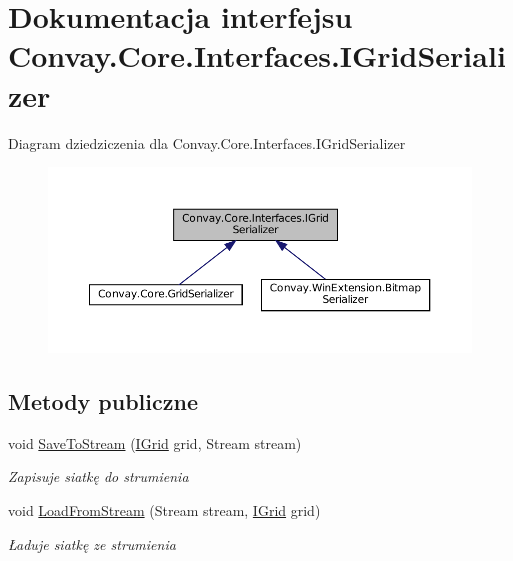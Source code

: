 \hypertarget{interface_convay_1_1_core_1_1_interfaces_1_1_i_grid_serializer}{}\section{Dokumentacja interfejsu Convay.\+Core.\+Interfaces.\+I\+Grid\+Serializer}
\label{interface_convay_1_1_core_1_1_interfaces_1_1_i_grid_serializer}


Diagram dziedziczenia dla Convay.\+Core.\+Interfaces.\+I\+Grid\+Serializer
\nopagebreak
\begin{figure}[H]
\begin{center}
\leavevmode
\includegraphics[width=350pt]{interface_convay_1_1_core_1_1_interfaces_1_1_i_grid_serializer__inherit__graph}
\end{center}
\end{figure}
\subsection*{Metody publiczne}
\begin{DoxyCompactItemize}
\item 
void \hyperlink{interface_convay_1_1_core_1_1_interfaces_1_1_i_grid_serializer_ac8de4f85acd03d95f73a7c7f85db43b2}{Save\+To\+Stream} (\hyperlink{interface_convay_1_1_core_1_1_interfaces_1_1_i_grid}{I\+Grid} grid, Stream stream)
\begin{DoxyCompactList}\small\item\em Zapisuje siatkę do strumienia \end{DoxyCompactList}\item 
void \hyperlink{interface_convay_1_1_core_1_1_interfaces_1_1_i_grid_serializer_ab6297bf5bb8f31e4ee4c27e4edfcd2bc}{Load\+From\+Stream} (Stream stream, \hyperlink{interface_convay_1_1_core_1_1_interfaces_1_1_i_grid}{I\+Grid} grid)
\begin{DoxyCompactList}\small\item\em Ładuje siatkę ze strumienia \end{DoxyCompactList}\end{DoxyCompactItemize}


